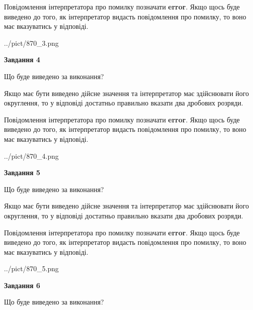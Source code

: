 \documentclass[12pt, ukrainian]{article}
\begin{document}
{\begin {Large}
Повідомлення інтерпретатора про помилку позначати \textbf{error}.
Якщо щось буде виведено до того, як інтерпретатор видасть повідомлення про помилку, 
то воно має вказуватись у відповіді. \par

\begin{center}
	{../pict/870_3.png}
\end{center}
\newpage

{\begin {center}\textbf{Завдання 4}\end {center}}\par
Що буде виведено за виконання? \par

Якщо має бути виведено дійсне значення та інтерпретатор має здійснювати його округлення, 
то у відповіді достатньо правильно вказати два дробових розряди.

Повідомлення інтерпретатора про помилку позначати \textbf{error}.
Якщо щось буде виведено до того, як інтерпретатор видасть повідомлення про помилку, 
то воно має вказуватись у відповіді. \par

\begin{center}
	{../pict/870_4.png}
\end{center}
\newpage

{\begin {center}\textbf{Завдання 5}\end {center}}\par
Що буде виведено за виконання? \par

Якщо має бути виведено дійсне значення та інтерпретатор має здійснювати його округлення, 
то у відповіді достатньо правильно вказати два дробових розряди.

Повідомлення інтерпретатора про помилку позначати \textbf{error}.
Якщо щось буде виведено до того, як інтерпретатор видасть повідомлення про помилку, 
то воно має вказуватись у відповіді. \par

\begin{center}
	{../pict/870_5.png}
\end{center}
\newpage

{\begin {center}\textbf{Завдання 6}\end {center}}\par
Що буде виведено за виконання? \par


\end{Large}}
\end{document}
